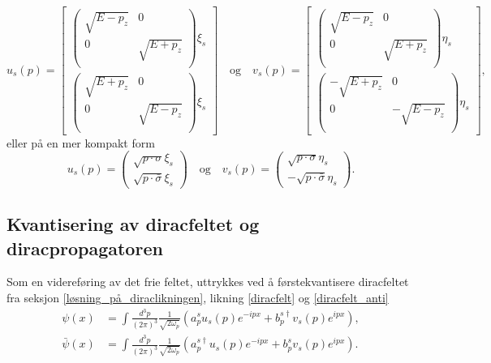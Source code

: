 \documentclass{article}
\begin{document}
\begin{equation*}
    u_s(p) =
    \begin{bmatrix*}
        \begin{pmatrix*}
            \sqrt{E - p_z} & 0 \\
            0 & \sqrt{E + p_z} \\
        \end{pmatrix*} \xi_s \\
        \begin{pmatrix*}
            \sqrt{E + p_z} & 0 \\
            0 & \sqrt{E - p_z} \\
        \end{pmatrix*} \xi_s
    \end{bmatrix*}
\quad \text{og} \quad
    v_s(p) =
    \begin{bmatrix*}
        \begin{pmatrix*}
            \sqrt{E - p_z} & 0 \\
            0 & \sqrt{E + p_z} \\
        \end{pmatrix*} \eta_s \\
        \begin{pmatrix*}
            -\sqrt{E + p_z} & 0 \\
            0 & -\sqrt{E - p_z} \\
        \end{pmatrix*} \eta_s
    \end{bmatrix*},
\end{equation*}
eller på en mer kompakt form
\begin{equation*}
    u_s(p) =
        \begin{pmatrix*}
            \sqrt{p\cdot\sigma} \xi_s \\
            \sqrt{p\cdot\bar{\sigma}} \xi_s
        \end{pmatrix*}
\quad \text{og} \quad
    v_s(p) =
        \begin{pmatrix*}
            \sqrt{p\cdot\sigma} \eta_s \\
            -\sqrt{p\cdot\bar{\sigma}} \eta_s
        \end{pmatrix*}.
\end{equation*}

\subsection{Kvantisering av diracfeltet og diracpropagatoren}
Som en videreføring av det frie feltet, uttrykkes ved å førstekvantisere diracfeltet fra seksjon \ref{løsning_på_diraclikningen}, likning \eqref{diracfelt} og \eqref{diracfelt_anti}
\begin{equation*}
    \begin{split}
    \psi(x) &= 
        \int \frac{d^3p}{(2\pi)^3} \frac{1}{\sqrt{2\omega_p}} (a^s_p u_s(p) e^{-ipx} + b^{s\dagger}_p v_s(p) e^{ipx}), \\
    \bar{\psi}(x) &= 
        \int \frac{d^3p}{(2\pi)^3} \frac{1}{\sqrt{2\omega_p}} (a^{s\dagger}_p u_s(p) e^{-ipx} + b^s_p v_s(p) e^{ipx}).
    \end{split}
\end{equation*}
\end{document}
